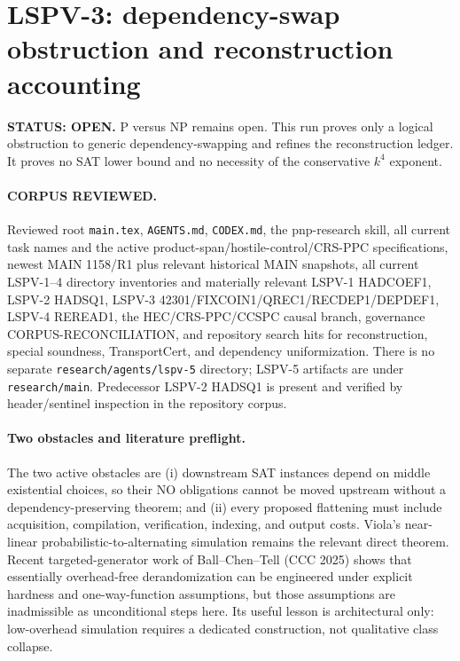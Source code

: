 \documentclass[11pt]{article}
\begin{document}
\section*{LSPV-3: dependency-swap obstruction and reconstruction accounting}
\textbf{STATUS: OPEN.} P versus NP remains open. This run proves only a logical obstruction to generic dependency-swapping and refines the reconstruction ledger. It proves no SAT lower bound and no necessity of the conservative $k^4$ exponent.

\paragraph{CORPUS REVIEWED.}
Reviewed root \texttt{main.tex}, \texttt{AGENTS.md}, \texttt{CODEX.md}, the pnp-research skill, all current task names and the active product-span/hostile-control/CRS-PPC specifications, newest MAIN 1158/R1 plus relevant historical MAIN snapshots, all current LSPV-1--4 directory inventories and materially relevant LSPV-1 HADCOEF1, LSPV-2 HADSQ1, LSPV-3 42301/FIXCOIN1/QREC1/RECDEP1/DEPDEF1, LSPV-4 REREAD1, the HEC/CRS-PPC/CCSPC causal branch, governance CORPUS-RECONCILIATION, and repository search hits for reconstruction, special soundness, TransportCert, and dependency uniformization. There is no separate \texttt{research/agents/lspv-5} directory; LSPV-5 artifacts are under \texttt{research/main}. Predecessor LSPV-2 HADSQ1 is present and verified by header/sentinel inspection in the repository corpus.

\paragraph{Two obstacles and literature preflight.}
The two active obstacles are (i) downstream SAT instances depend on middle existential choices, so their NO obligations cannot be moved upstream without a dependency-preserving theorem; and (ii) every proposed flattening must include acquisition, compilation, verification, indexing, and output costs. Viola's near-linear probabilistic-to-alternating simulation remains the relevant direct theorem. Recent targeted-generator work of Ball--Chen--Tell (CCC 2025) shows that essentially overhead-free derandomization can be engineered under explicit hardness and one-way-function assumptions, but those assumptions are inadmissible as unconditional steps here. Its useful lesson is architectural only: low-overhead simulation requires a dedicated construction, not qualitative class collapse.
\end{document}
